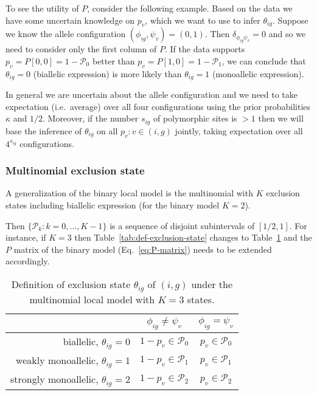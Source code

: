 \documentclass[letterpaper]{article}
\begin{document}
To see the utility of \(P\), consider the
following
example.  Based on the data we have some uncertain knowledge on \(p_v\),
which we want to use to infer \(\theta_{ig}\).  Suppose we know the allele
configuration \((\phi_{ig},\psi_v)=(0,1)\).  Then
\(\delta_{\phi_{ig}\psi_v}=0\) and so we need to consider only the first column of
\(P\).  If the data supports \(p_v = P[0,0] = 1-\mathcal{P}_0\) better than
\(p_v = P[1,0] = 1-\mathcal{P}_1\), we can conclude that \(\theta_{ig}=0\)
(biallelic expression) is more likely than \(\theta_{ig}=1\) (monoallelic
expression).

In general we are uncertain about the allele configuration and
we need to take expectation (i.e.~average) over all four configurations using the prior
probabilities \(\kappa\) and \(1/2\).  Moreover, if the number \(s_{ig}\) of polymorphic sites
is \(>1\) then we will base the inference of \(\theta_{ig}\) on all
\(p_v: v\in(i,g)\) jointly, taking expectation over all \(4^{s_{ig}}\)
configurations.

\subsubsection{Multinomial exclusion state}
\label{sec:local-multinomial}

A generalization of the binary local model is the multinomial with \(K\)
exclusion states including biallelic expression (for the binary model \(K=2\)).

Then \(\{\mathcal{P}_k: k=0,...,K-1\}\) is a sequence of disjoint subintervals
of \([1/2,1]\).  For instance, if \(K=3\) then
Table~\ref{tab:def-exclusion-state} changes to
Table~\ref{tab:def-exclusion-state-multi} and the \(P\) matrix of the binary
model (Eq.~\ref{eq:P-matrix}) needs to be
extended accordingly.
\begin{table}[t]
\begin{center}
\begin{tabular}{r|cc|}
& \(\phi_{ig}\neq\psi_v\) & \(\phi_{ig}=\psi_v\) \\
\hline
biallelic, \(\theta_{ig}=0\) & \(1-p_v \in \mathcal{P}_0\) & \(p_v \in \mathcal{P}_0\) \\
weakly monoallelic, \(\theta_{ig}=1\) & \(1-p_v \in \mathcal{P}_1\) & \(p_v \in \mathcal{P}_1\) \\
strongly monoallelic, \(\theta_{ig}=2\) & \(1-p_v \in \mathcal{P}_2\) & \(p_v \in \mathcal{P}_2\) \\
\hline
\end{tabular}
\caption{
Definition of exclusion state \(\theta_{ig}\) of \((i,g)\) under the
multinomial local model with \(K=3\) states.
}
\label{tab:def-exclusion-state-multi}
\end{center}
\end{table}
\end{document}
